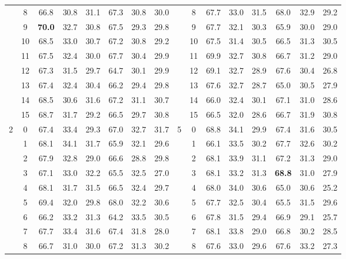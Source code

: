 \begin{table}[p]
{\begin{tabular}{c c | c c c | c c c || c c | c c c | c c c}
             & 8 & 66.8 & 30.8 & 31.1 & 67.3 & 30.8 & 30.0 &  & 8 & 67.7 & 33.0 & 31.5 & 68.0 & 32.9 & 29.2 \\
             & 9 & \textbf{70.0} & 32.7 & 30.8 & 67.5 & 29.3 & 29.8 &  & 9 & 67.7 & 32.1 & 30.3 & 65.9 & 30.0 & 29.0 \\
             & 10 & 68.5 & 33.0 & 30.7 & 67.2 & 30.8 & 29.2 &  & 10 & 67.5 & 31.4 & 30.5 & 66.5 & 31.3 & 30.5 \\
             & 11 & 67.5 & 32.4 & 30.0 & 67.7 & 30.4 & 29.9 &  & 11 & 69.9 & 32.7 & 30.8 & 66.7 & 31.2 & 29.0 \\
             & 12 & 67.3 & 31.5 & 29.7 & 64.7 & 30.1 & 29.9 &  & 12 & 69.1 & 32.7 & 28.9 & 67.6 & 30.4 & 26.8 \\
             & 13 & 67.4 & 32.4 & 30.4 & 66.2 & 29.4 & 29.8 &  & 13 & 67.6 & 32.7 & 28.7 & 65.0 & 30.5 & 27.9 \\
             & 14 & 68.5 & 30.6 & 31.6 & 67.2 & 31.1 & 30.7 &  & 14 & 66.0 & 32.4 & 30.1 & 67.1 & 31.0 & 28.6 \\
             & 15 & 68.7 & 31.7 & 29.2 & 66.5 & 29.7 & 30.8 &  & 15 & 66.5 & 32.0 & 28.6 & 66.7 & 31.9 & 30.8 \\
            \midrule
            \multirow{16}{*}{2} & 0 & 67.4 & 33.4 & 29.3 & 67.0 & 32.7 & 31.7 & \multirow{16}{*}{5} & 0 & 68.8 & 34.1 & 29.9 & 67.4 & 31.6 & 30.5 \\
             & 1 & 68.1 & 34.1 & 31.7 & 65.9 & 32.1 & 29.6 &  & 1 & 66.1 & 33.5 & 30.2 & 67.7 & 32.6 & 30.2 \\
             & 2 & 67.9 & 32.8 & 29.0 & 66.6 & 28.8 & 29.8 &  & 2 & 68.1 & 33.9 & 31.1 & 67.2 & 31.3 & 29.0 \\
             & 3 & 67.1 & 33.0 & 32.2 & 65.5 & 32.5 & 27.0 &  & 3 & 68.1 & 33.2 & 31.3 & \textbf{68.8} & 31.0 & 27.9 \\
             & 4 & 68.1 & 31.7 & 31.5 & 66.5 & 32.4 & 29.7 &  & 4 & 68.0 & 34.0 & 30.6 & 65.0 & 30.6 & 25.2 \\
             & 5 & 69.4 & 32.0 & 29.8 & 68.0 & 32.2 & 30.6 &  & 5 & 67.7 & 32.5 & 30.4 & 65.5 & 31.5 & 29.6 \\
             & 6 & 66.2 & 33.2 & 31.3 & 64.2 & 33.5 & 30.5 &  & 6 & 67.8 & 31.5 & 29.4 & 66.9 & 29.1 & 25.7 \\
             & 7 & 67.7 & 33.4 & 31.6 & 67.4 & 31.8 & 28.0 &  & 7 & 68.1 & 33.8 & 29.0 & 66.8 & 30.2 & 28.5 \\
             & 8 & 66.7 & 31.0 & 30.0 & 67.2 & 31.3 & 30.2 &  & 8 & 67.6 & 33.0 & 29.6 & 67.6 & 33.2 & 27.3 \\

\end{tabular}}
\end{table}

